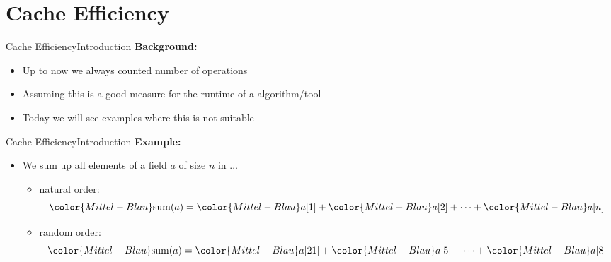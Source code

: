 \section{Cache Efficiency}


\begin{frame}{Cache Efficiency}{Introduction}
  \textbf{Background:}
  \begin{itemize}
    \item<2->
      Up to now we always counted {\color{Mittel-Blau}number of operations}
    \item<2->
      Assuming this is a good measure for the runtime of a algorithm/tool
    \item<3->
      Today we will see examples where this is not suitable
  \end{itemize}
\end{frame}


\begin{frame}{Cache Efficiency}{Introduction}
  \textbf{Example:}
  \begin{itemize}
    \item
      We sum up all elements of a field {\color{Mittel-Blau}$a$} of size
      {\color{Mittel-Blau}$n$} in $\ldots$
    \begin{itemize}
      \item
        natural order:
        \begin{displaymath}
          {\color{Mittel-Blau}\mathrm{sum}(a)} =
          {\color{Mittel-Blau}a[1]} +
          {\color{Mittel-Blau}a[2]} +
          \dots +
          {\color{Mittel-Blau}a[n]}
        \end{displaymath}
      \item
        random order:
        \begin{displaymath}
          {\color{Mittel-Blau}\mathrm{sum}(a)} =
          {\color{Mittel-Blau}a[21]} +
          {\color{Mittel-Blau}a[5]} +
          \dots +
          {\color{Mittel-Blau}a[8]}
        \end{displaymath}
    \end{itemize}
  \end{itemize}
\end{frame}


